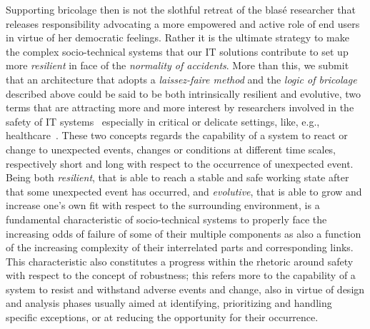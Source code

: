 \documentclass{article}
\begin{document}
Supporting bricolage then is not the slothful retreat of the blas\'{e} researcher that releases responsibility advocating a more empowered and active role of end users in virtue of her democratic feelings. Rather it is the ultimate strategy to make the complex socio-technical systems that our IT solutions contribute to set up more \emph{resilient} in face of the \emph{normality of accidents}.
More than this, we submit that an architecture that adopts a \emph{laissez-faire method} and the \emph{logic of bricolage} described above could be said to be both intrinsically resilient and evolutive, two terms that are attracting more and more interest by researchers involved in the safety of IT systems~\citep{hanseth_risk_2007} especially in critical or delicate settings, like, e.g., healthcare~\citep{hollnagel_resilience_2008}. These two concepts regards the capability of a system to react or change to unexpected events, changes or conditions at different time scales, respectively short and long with respect to the occurrence of unexpected event. Being both \emph{resilient}, that is able to reach a stable and safe working state after that some unexpected event has occurred, and \emph{evolutive}, that is able to grow and increase one's own fit with respect to the surrounding environment, is a fundamental characteristic of socio-technical systems to properly face the increasing odds of failure of some of their multiple components as also a function of the increasing complexity of their interrelated parts and corresponding links. This characteristic also constitutes a progress within the rhetoric around safety with respect to the concept of robustness; this refers more to the capability of a system to resist and withstand adverse events and change, also in virtue of design and analysis phases usually aimed at identifying, prioritizing and handling specific exceptions, or at reducing the opportunity for their occurrence.
\end{document}
